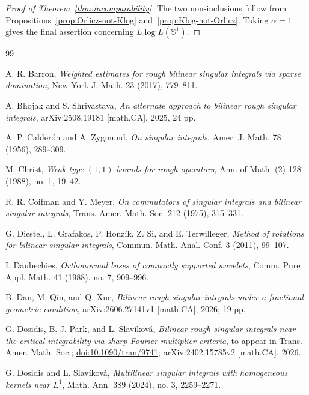 \documentclass[11pt]{amsart}
\theoremstyle{remark}
\numberwithin{equation}{section}
\newcommand{\Sph}{\mathbb S^1}
\begin{document}
	\begin{proof}[Proof of Theorem~\ref{thm:incomparability}]
		The two non-inclusions follow from
		Propositions~\ref{prop:Orlicz-not-Klog}
		and~\ref{prop:Klog-not-Orlicz}.  Taking \(\alpha=1\) gives the final
		assertion concerning \(L\log L(\Sph)\).
	\end{proof}
	
	\begin{thebibliography}{99}
		
		A. R. Barron,
		\emph{Weighted estimates for rough bilinear singular integrals via sparse
			domination},
		New York J. Math. 23 (2017), 779--811.
		
		A. Bhojak and S. Shrivastava,
		\emph{An alternate approach to bilinear rough singular integrals},
		arXiv:2508.19181 [math.CA], 2025, 24 pp.
		
		A. P. Calder\'on and A. Zygmund,
		\emph{On singular integrals},
		Amer. J. Math. 78 (1956), 289--309.
		
		M. Christ,
		\emph{Weak type \((1,1)\) bounds for rough operators},
		Ann. of Math. (2) 128 (1988), no. 1, 19--42.
		
		R. R. Coifman and Y. Meyer,
		\emph{On commutators of singular integrals and bilinear singular
			integrals},
		Trans. Amer. Math. Soc. 212 (1975), 315--331.
		
		G. Diestel, L. Grafakos, P. Honz\'ik, Z. Si, and E. Terwilleger,
		\emph{Method of rotations for bilinear singular integrals},
		Commun. Math. Anal. Conf. 3 (2011), 99--107.
		
		I. Daubechies,
		\emph{Orthonormal bases of compactly supported wavelets},
		Comm. Pure Appl. Math. 41 (1988), no. 7, 909--996.
		
		B. Dan, M. Qin, and Q. Xue,
		\emph{Bilinear rough singular integrals under a fractional geometric
			condition},
		arXiv:2606.27141v1 [math.CA], 2026, 19 pp.
		
		G. Dosidis, B. J. Park, and L. Slav\'{i}kov\'{a},
		\emph{Bilinear rough singular integrals near the critical integrability via
			sharp Fourier multiplier criteria},
		to appear in Trans. Amer. Math. Soc.;
		\href{https://doi.org/10.1090/tran/9741}{doi:10.1090/tran/9741};
		arXiv:2402.15785v2 [math.CA], 2026.
		
		G. Dosidis and L. Slav\'ikov\'a,
		\emph{Multilinear singular integrals with homogeneous kernels near
			\(L^1\)},
		Math. Ann. 389 (2024), no. 3, 2259--2271.
		

\end{thebibliography}
\end{document}
